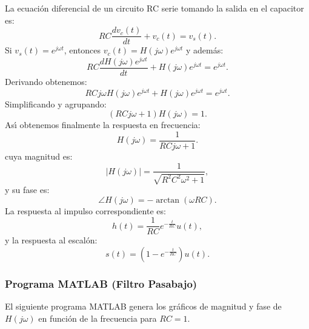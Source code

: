 La ecuación diferencial de un circuito RC serie tomando la salida en el capacitor es:
\begin{equation}
	RC\frac{dv_{c}(t)}{dt} + v_{c}(t) = v_{s}(t).
\end{equation}
Si $v_{s}(t) = e^{j\omega t}$, entonces $v_{c}(t) = H(j\omega) e^{j\omega t}$ y adem\'{a}s:
\begin{equation}
	RC\frac{dH(j\omega) e^{j\omega t}}{dt} + H(j\omega) e^{j\omega t} = e^{j\omega t}.
\end{equation}
Derivando obtenemos:
\begin{equation}
	RC j\omega H(j\omega) e^{j\omega t} + H(j\omega) e^{j\omega t} = e^{j\omega t}.
\end{equation}
Simplificando y agrupando:
\begin{equation}
	(RC j\omega + 1) H(j\omega) = 1.
\end{equation}
As\'{\i} obtenemos finalmente la respuesta en frecuencia:
\begin{equation}
	H(j\omega) = \frac{1}{R C j\omega + 1}.
\end{equation}
cuya magnitud es:
\begin{equation}
	|H(j\omega)| = \frac{1}{\sqrt{R^{2} C^{2} \omega^{2} + 1}},
\end{equation}
y su fase es:
\begin{equation}
	\angle H(j\omega) = -\arctan(\omega R C).
\end{equation}
La respuesta al impulso correspondiente es:
\begin{equation}
	h(t) = \frac{1}{RC} e^{-\frac{t}{RC}} u(t),
\end{equation}
y la respuesta al escalón:
\begin{equation}
	s(t) = \left( 1 - e^{-\frac{t}{RC}} \right) u(t).
\end{equation}

\subsubsection{Programa MATLAB (Filtro Pasabajo)}

El siguiente programa MATLAB genera los gr\'{a}ficos de magnitud y fase de $H(j\omega)$ en funci\'{o}n de la frecuencia para $RC=1$.

